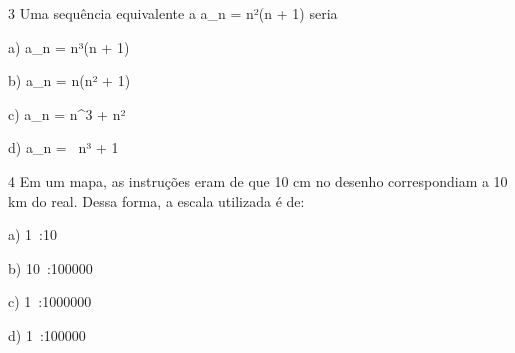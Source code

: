 
\num{3} Uma sequência equivalente a a_{n} = n²(n + 1) seria

a) a_{n} = n³(n + 1)

b) a_{n} = n(n² + 1)

c) a_{n} = n^{3} + n²

d) a_{n} = \ n³ + 1



\num{4} Em um mapa, as instruções eram de que 10 cm no desenho correspondiam
a 10 km do real. Dessa forma, a escala utilizada é de:

a) 1\ :10

b) 10\ :100000

c) 1\ :1000000

d) 1\ :100000



